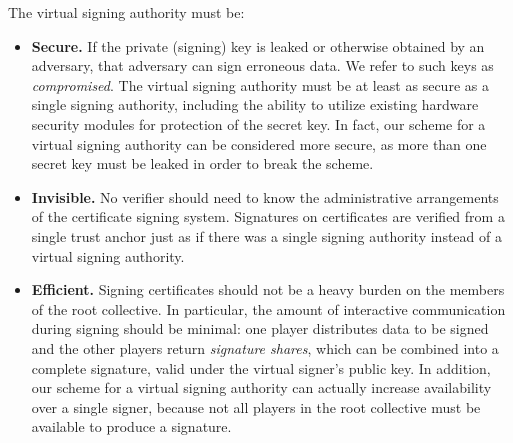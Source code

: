 The virtual signing authority must be:
\begin{itemize}
\item {\bf Secure.} If the private (signing) key is leaked or
otherwise obtained by an adversary, that adversary can sign erroneous
data. We refer to such keys as {\it compromised}. The virtual signing
authority must be at least as secure as a single signing authority,
including the ability to utilize existing hardware security modules
for protection of the secret key. In fact, our scheme for a virtual
signing authority can be considered more secure, as more than one
secret key must be leaked in order to break the scheme.

\item {\bf Invisible.} No verifier should need to know the
administrative arrangements of the certificate signing
system. Signatures on certificates are verified from a single trust
anchor just as if there was a single signing authority instead of a
virtual signing authority.

\item {\bf Efficient.} Signing certificates should not be a heavy
burden on the members of the root collective. In particular, the
amount of interactive communication during signing should be minimal:
one player distributes data to be signed and the other players return
{\it signature shares}, which can be combined into a complete signature,
valid under the virtual signer's public key. In addition, our scheme
for a virtual signing authority can actually increase availability
over a single signer, because not all players in the root collective
must be available to produce a signature.
\end{itemize}

